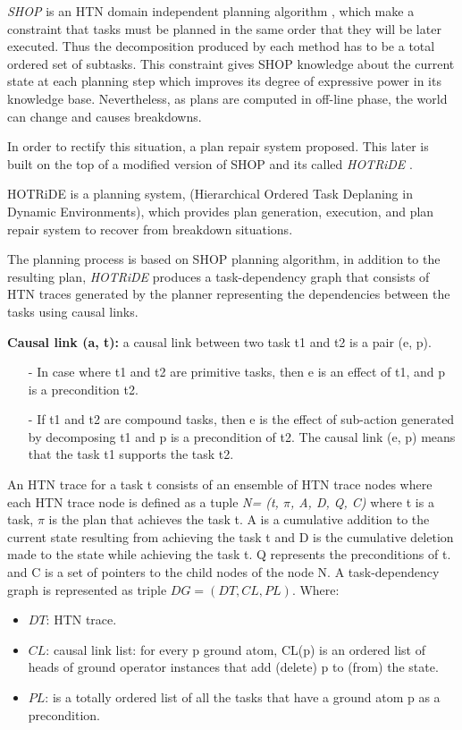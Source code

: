 \textit{SHOP} is an HTN domain independent planning algorithm , which make a constraint that tasks must be planned in the same order that they will be later executed. Thus the decomposition produced by each method has to be a total ordered set of subtasks. This constraint gives SHOP knowledge about the current state at each planning step which improves its degree of expressive power in its knowledge base. Nevertheless, as plans are computed in off-line phase, the world can change and causes breakdowns.

 
In order to rectify this situation, a plan repair system proposed. This later is built on the top of a modified version of SHOP and its called \textit{HOTRiDE} \cite{ayan2007hotride}.

HOTRiDE is a planning system, (Hierarchical Ordered Task Deplaning in Dynamic Environments), which provides plan generation, execution, and plan repair system to recover from breakdown situations. 


The planning process is based on SHOP planning algorithm, in addition to the resulting plan, \textit{HOTRiDE} produces a task-dependency graph that consists of HTN traces generated by the planner  representing the dependencies between the tasks using causal links.

\textbf{Causal link (a, t):} a causal link between two task t1 and t2 is a pair (e, p). 
\begin{itemize}
\item[-]In case where t1 and t2 are primitive tasks, then e is an effect of t1, and p is a precondition t2.
\item[-]If t1 and t2 are compound tasks, then e is the effect of sub-action generated by decomposing t1 and p is a precondition of t2. The causal link (e, p) means that the task t1 supports the task t2.
\end{itemize}


An HTN trace for a task t consists of an ensemble of HTN trace nodes where each HTN trace node is defined as a tuple \textit{N= (t, $\pi$, A, D, Q, C)} where t is a task, $\pi$ is the plan that achieves the task t. A is a cumulative addition to the current state resulting from achieving the task t and D is the cumulative deletion made to the state while achieving the task t. Q represents the preconditions of t. and C is a  set of pointers to the child nodes of the node N.
A task-dependency graph is represented as triple $DG = (DT, CL, PL)$. Where:
\begin{itemize}
\item$	DT$: HTN trace.
	\item $CL$: causal link list: for every p ground atom, CL(p) is an ordered list of heads of ground operator instances that add (delete) p to (from) the state. 
	\item $PL$: is a totally ordered list of all the tasks that have a ground atom p as a precondition. 
\end{itemize}


